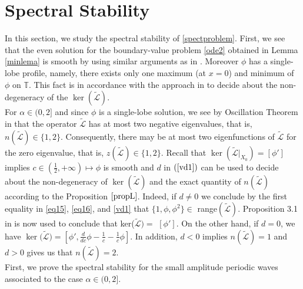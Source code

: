 \documentclass[12pt,reqno]{amsart}
\newcommand{\2}{L^2_{per}(0, T)}
\numberwithin{equation}{section}
\numberwithin{figure}{section}
\begin{document}
\section{Spectral Stability}
 In this section, we study the spectral stability of \eqref{spectproblem}. First, we see that the even solution  for the boundary-value problem \eqref{ode2} obtained in Lemma \ref{minlema} is smooth by using similar arguments as in \cite[Proposition 2.4]{NPL}.  Moreover $\phi$ has a single-lobe profile, namely, there exists only one maximum (at $x=0$) and minimum of $\phi$ on $\mathbb{T}$. This  fact is in accordance with the approach in \cite{hur} to decide about the non-degeneracy of the $\ker(\mathcal{\tilde{L}})$.\\
 \indent For $\alpha \in (0, 2]$ and since $\phi$ is a single-lobe solution, we see by Oscillation Theorem in \cite{hur} that the operator $\mathcal{\tilde{L}}$ has at most two negative eigenvalues, that is, $n(\mathcal{\tilde{L}}) \in \{1,2\}$. Consequently, there may be at most two eigenfunctions of $\mathcal{\tilde{L}}$ for the zero eigenvalue, that is, $z(\mathcal{\tilde{L}})\in \{1,2\}$. Recall that $\ker(\tilde{\mathcal{L}}|_{X_0})=[\phi']$ implies $c\in\left(\frac{1}{2},+\infty\right)\mapsto \phi$ is smooth and $d$ in $(\ref{vd1})$ can be used to decide about the non-degeneracy of $\ker(\tilde{\mathcal{L}})$ and the exact quantity of $n(\tilde{\mathcal{L}})$ according to the Proposition $\ref{propL}$. Indeed, if $d\neq0$ we conclude by the first equality in \eqref{eq15}, \eqref{eq16}, and \eqref{vd1} that  $\{1, \phi, \phi^2\} \in$ range$(\mathcal{\tilde{\mathcal{L}}})$. Proposition 3.1 in \cite{hur} is now used to conclude that ker($\mathcal{\tilde{L}})=$ $[\phi']$. On the other hand, if $d=0$, we have $\ker(\mathcal{\tilde{L})}= \left[\phi', \frac{d}{dc} \phi - \frac{1}{c}-\frac{1}{c}	 \phi \right]$. In addition, $d<0$ implies $n(\tilde{\mathcal{L}})=1$ and $d>0$ gives us that $n(\tilde{\mathcal{L}})=2$.\\
\indent First, we prove the spectral stability for the small amplitude periodic waves associated to the case $\alpha\in(0,2]$.
\end{document}
